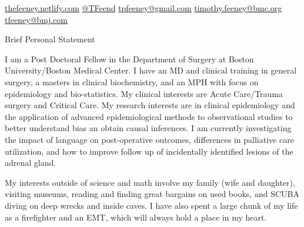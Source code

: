 \documentclass{resume} %
\begin{document}
%

\begin{center}
 \href{https://thefeeney.netlify.com}{thefeeney.netlify.com}
  \hspace*{0.3in}  
 \href{https://twitter.com/TFeend}{@TFeend}
  \hspace*{0.3in}  
   \href{mailto:tpfeeney@gmail.com}{tpfeeney@gmail.com}
  \hspace*{0.3in}  
  \href{mailto:timothy.feeney@bmc.org}{timothy.feeney@bmc.org}
  \hspace*{0.3in}  
  \href{mailto:tfeeney@bmj.com}{tfeeney@bmj.com}
  \end{center}

\begin{rSection}{Brief Personal Statement}


{I am a Post Doctoral Fellow in the Department of Surgery at Boston University/Boston Medical Center. I have an MD and clinical training in general surgery, a masters in clinical biochemistry, and an MPH with focus on epidemiology and bio-statistics. My clinical interests are Acute Care/Trauma surgery and Critical Care. My research interests are in clinical epidemiology and the application of advanced epidemiological methods to observational studies to better understand bias an obtain causal inferences. I am currently investigating the impact of language on post-operative outcomes, differences in palliative care utilization, and how to improve follow up of incidentally identified lesions of the adrenal gland.

My interests outside of science and math involve my family (wife and daughter), visiting museums, reading and finding great bargains on used books, and SCUBA diving on deep wrecks and inside caves. I have also spent a large chunk of my life as a firefighter and an EMT, which will always hold a place in my heart.}

\end{rSection}
\end{document}
